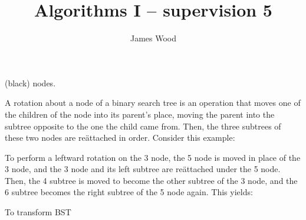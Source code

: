 \message{ !name(s4.tex)}\documentclass[11pt]{article}
\title{\textbf{Algorithms I -- supervision 5}}
\author{James Wood}
\begin{document}
 (black) nodes.
\item
  A rotation about a node of a binary search tree is an operation that moves one of the children of the node into its parent's place, moving the parent into the subtree opposite to the one the child came from. Then, the three subtrees of these two nodes are reättached in order. Consider this example:


  To perform a leftward rotation on the 3 node, the 5 node is moved in place of the 3 node, and the 3 node and its left subtree are reättached under the 5 node. Then, the 4 subtree is moved to become the other subtree of the 3 node, and the 6 subtree becomes the right subtree of the 5 node again. This yields:

\item To transform BST 
\end{document}
